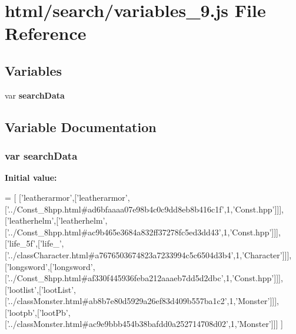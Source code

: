 \section{html/search/variables\-\_\-9.js File Reference}
\label{variables__9_8js}
\subsection*{Variables}
\begin{DoxyCompactItemize}
\item 
var {\bf search\-Data}
\end{DoxyCompactItemize}


\subsection{Variable Documentation}
\subsubsection[{search\-Data}]{\setlength{\rightskip}{0pt plus 5cm}var search\-Data}\label{variables__9_8js_ad01a7523f103d6242ef9b0451861231e}
{\bfseries Initial value\-:}
\begin{DoxyCode}
=
[
  [\textcolor{stringliteral}{'leatherarmor'},[\textcolor{stringliteral}{'leatherarmor'},[\textcolor{stringliteral}{'../Const\_8hpp.html#ad6bfaaaa07e98b4c0c9dd8eb8b416c1f'},1,\textcolor{stringliteral}{'Const.hpp'}]]],
  [\textcolor{stringliteral}{'leatherhelm'},[\textcolor{stringliteral}{'leatherhelm'},[\textcolor{stringliteral}{'../Const\_8hpp.html#ac9b465e3684a832ff37278fc5ed3dd43'},1,\textcolor{stringliteral}{'Const.hpp'}]]],
  [\textcolor{stringliteral}{'life\_5f'},[\textcolor{stringliteral}{'life\_'},[\textcolor{stringliteral}{'../classCharacter.html#a7676503674823a7233994c5c6504d3b4'},1,\textcolor{stringliteral}{'Character'}]]],
  [\textcolor{stringliteral}{'longsword'},[\textcolor{stringliteral}{'longsword'},[\textcolor{stringliteral}{'../Const\_8hpp.html#af330f445936feba212aaaeb7dd5d2dbc'},1,\textcolor{stringliteral}{'Const.hpp'}]]],
  [\textcolor{stringliteral}{'lootlist'},[\textcolor{stringliteral}{'lootList'},[\textcolor{stringliteral}{'../classMonster.html#ab8b7e80d5929a26ef83d409b557ba1c2'},1,\textcolor{stringliteral}{'Monster'}]]],
  [\textcolor{stringliteral}{'lootpb'},[\textcolor{stringliteral}{'lootPb'},[\textcolor{stringliteral}{'../classMonster.html#ac9e9bbb454b38bafdd0a252714708d02'},1,\textcolor{stringliteral}{'Monster'}]]]
]
\end{DoxyCode}
